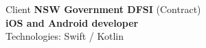 \documentclass{article}
\begin{document}
%
%
%
%
%
%
%
%
%
Client \textbf {NSW Government DFSI}  (Contract)  \\
\textbf{ iOS and Android developer }\\
Technologies: Swift / Kotlin \\
\end{document}
